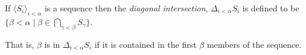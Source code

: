 \documentclass[12pt]{article}
\begin{document}
If $\langle S_i\rangle_{i<\alpha}$ is a sequence then the \emph{diagonal intersection}, $\Delta_{i<\alpha} S_i$ is defined to be $\{\beta<\alpha\mid\beta\in \bigcap_{\gamma<\beta} S_\gamma\}$.

That is, $\beta$ is in $\Delta_{i<\alpha} S_i$ if it is contained in the first $\beta$ members of the sequence.
\end{document}
